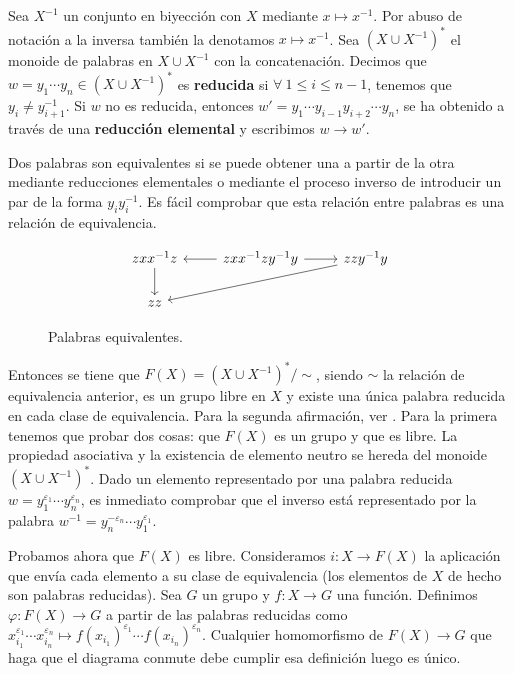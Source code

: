 \documentclass[bibtex, anon]{TEMat-article}
\begin{document}
\begin{demostracion}
	Sea $X^{-1}$ un conjunto en biyección con $X$ mediante $x\mapsto x^{-1}$. Por abuso de notación a la inversa también la denotamos $x\mapsto x^{-1}$. Sea $(X\cup X^{-1})^*$ el monoide de palabras en $X\cup X^{-1}$ con la concatenación. Decimos que $w=y_1\cdots y_n\in (X\cup X^{-1})^*$ es \textbf{reducida} si $\forall\ 1\leq i\leq n-1$, tenemos que $y_i\neq y_{i+1}^{-1}$. Si $w$ no es reducida, entonces $w'=y_1\cdots y_{i-1}y_{i+2}\cdots y_n$, se ha obtenido a través de una \textbf{reducción elemental} y escribimos $w\to w'$. 
	
	Dos palabras son equivalentes si se puede obtener una a partir de la otra mediante reducciones elementales o mediante el proceso inverso de introducir un par de la forma $y_iy_i^{-1}$. Es fácil comprobar que esta relación entre palabras es una relación de equivalencia.
	\begin{figure}[h!]
	\[
	\begin{tikzcd}
	zxx^{-1}z\arrow[d] & zxx^{-1}zy^{-1}y\arrow[l]\arrow[r] &zzy^{-1}y\arrow[lld]\\
	zz 
	\end{tikzcd}
	\]
	\caption{Palabras equivalentes.}
		\end{figure}
	
	Entonces se tiene que $F(X)=(X\cup X^{-1})^*/\sim$, siendo $\sim$ la relación de equivalencia anterior, es un grupo libre en $X$ y existe una única palabra reducida en cada clase de equivalencia. Para la segunda afirmación, ver \cite[\S 1]{reduced}. Para la primera tenemos que probar dos cosas: que $F(X)$ es un grupo y que es libre. La propiedad asociativa y la existencia de elemento neutro se hereda del monoide $(X\cup X^{-1})^*$. Dado un elemento representado por una palabra reducida $w=y_1^{\varepsilon_1}\cdots y_n^{\varepsilon_n}$, es inmediato comprobar que el inverso está representado por la palabra $w^{-1}=y_n^{-\varepsilon_n}\cdots y_1^{\varepsilon_1}$. 
	
	Probamos ahora que $F(X)$ es libre. Consideramos $i:X\to F(X)$ la aplicación que envía cada elemento a su clase de equivalencia (los elementos de $X$ de hecho son palabras reducidas). Sea $G$ un grupo y $f:X\to G$ una función. Definimos $\varphi:F(X)\to G$ a partir de las palabras reducidas como $x_{i_1}^{\varepsilon_1}\cdots x_{i_n}^{\varepsilon_n}\mapsto f(x_{i_1})^{\varepsilon_1}\cdots f(x_{i_n})^{\varepsilon_n}$. Cualquier homomorfismo de $F(X)\to G$ que haga que el diagrama conmute debe cumplir esa definición luego es único. %
	
\end{demostracion}
\end{document}
